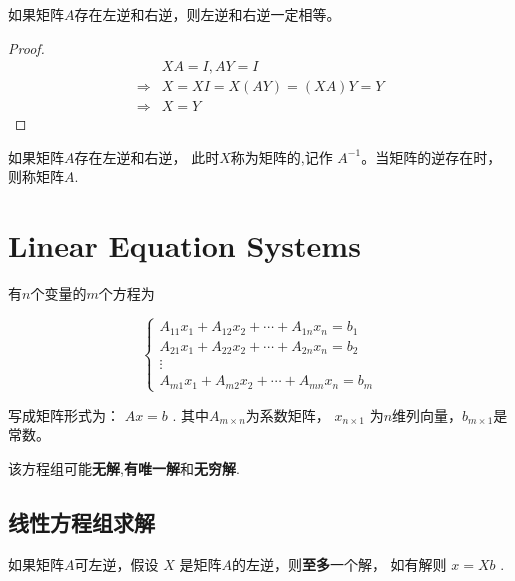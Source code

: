 \begin{theorem}
    如果矩阵$A$存在左逆和右逆，则左逆和右逆一定相等。
\end{theorem}

\begin{proof}
    \begin{equation}
    \begin{aligned}
    &X A=I, A Y=I  \\
    \Rightarrow&  X=X I=X(A Y)=(X A) Y=Y \\
    \Rightarrow& X=Y
    \end{aligned}
\end{equation}
\end{proof}

\begin{definition}[逆 $A^{-1}$]
    如果矩阵$A$存在左逆和右逆， 此时$X$称为矩阵的,记作 $ A^{-1} $。当矩阵的逆存在时，则称矩阵$A$.
\end{definition}

\section{Linear Equation Systems}

\begin{definition}
    有$n$个变量的$m$个方程为

    \begin{equation} \left\{\begin{array}{c}A_{11} x_{1}+A_{12} x_{2}+\cdots+A_{1 n} x_{n}=b_{1} \\ A_{21} x_{1}+A_{22} x_{2}+\cdots+A_{2 n} x_{n}=b_{2} \\ \vdots \\ A_{m 1} x_{1}+A_{m 2} x_{2}+\cdots+A_{m n} x_{n}=b_{m}\end{array}\right. \end{equation}

    写成矩阵形式为： $  {A} x= {b} $ . 其中$A_{m \times n}$为系数矩阵， $ x_{n \times 1} $ 为$n$维列向量，$b_{m \times 1}$是常数。 
\end{definition}

该方程组可能\textbf{无解},\textbf{有唯一解}和\textbf{无穷解}.

\subsection{线性方程组求解}

\begin{theorem}
    如果矩阵$A$可左逆，假设 $ X $ 是矩阵$A$的左逆，则\textbf{至多}一个解， 如有解则 $ x=X b $ . 
\end{theorem}

